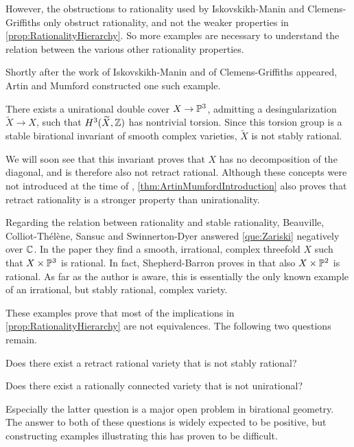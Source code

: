 However, the obstructions to rationality used by
Iskovskikh-Manin and Clemens-Griffiths
only obstruct rationality, and not the weaker properties in \cref{prop:RationalityHierarchy}. So more examples are necessary to understand the relation between the various other rationality properties.

Shortly after the work of Iskovskikh-Manin and of Clemens-Griffiths appeared, Artin and Mumford constructed one such example.
\begin{theorem}
	\label{thm:ArtinMumfordIntroduction}
	There exists a unirational double cover $X \to \P^3$, admitting a desingularization $\widetilde{X} \to X$, such that $H^3(\widetilde{X},\Z)$ has nontrivial torsion. Since this torsion group is a stable birational invariant of smooth complex varieties, $\widetilde{X}$ is not stably rational.
\end{theorem}
We will soon see that this invariant proves that $X$ has no decomposition of the diagonal, and is therefore also not retract rational. Although these concepts were not introduced at the time of \cite{ArtinMumford}, \cref{thm:ArtinMumfordIntroduction} also proves that retract rationality is a stronger property than unirationality.

Regarding the relation between rationality and stable rationality, Beauville, Colliot-Thélène, Sansuc and Swinnerton-Dyer answered \cref{que:Zariski} negatively over $\C$. In the paper \cite{BCTSSD} they find a smooth, irrational, complex threefold $X$ such that $X \times \P^3$ is rational. In fact, Shepherd-Barron proves in \cite{Shepherd-Barron} that also $X \times \P^2$ is rational. As far as the author is aware, this is essentially the only known example of an irrational, but stably rational, complex variety.

These examples prove that most of the implications in \cref{prop:RationalityHierarchy} are not equivalences. The following two questions remain.
\begin{question}
	\label{que:StableVsRetract}
	Does there exist a retract rational variety that is not stably rational?
\end{question}

\begin{question}
	\label{que:RationallyConnectedVsUnirational}
	Does there exist a rationally connected variety that is not unirational?
\end{question}
Especially the latter question is a major open problem in birational geometry. The answer to both of these questions is widely expected to be positive, but constructing examples illustrating this has proven to be difficult.

